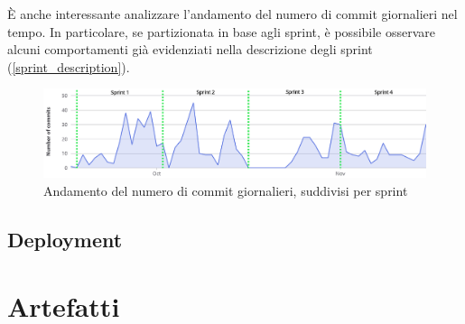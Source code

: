 \documentclass[11pt]{article}
\newcommand{\fref}[1]{\hyperref[#1]{\cref{#1}}}
\begin{document}
È anche interessante analizzare l'andamento del numero di commit giornalieri nel tempo.
In particolare, se partizionata in base agli sprint, è possibile osservare alcuni comportamenti già evidenziati nella descrizione degli sprint (\fref{sprint_description}).
\begin{figure}[H]
    \centering
    \includegraphics[width=15cm]{./img/git/commit.png}
    \caption{Andamento del numero di commit giornalieri, suddivisi per sprint}
\end{figure}


\subsection{Deployment}



\newpage
\section{Artefatti}


\end{document}
